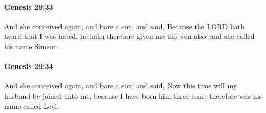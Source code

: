		\paragraph{Genesis 29:33} %
			\label{GENESIS-29-33}

			And she conceived again, and bare a son; and said, Because the LORD hath heard that I was hated, he hath therefore given me this son also: and she called his name Simeon.


		\paragraph{Genesis 29:34} %
			\label{GENESIS-29-34}

			And she conceived again, and bare a son; and said, Now this time will my husband be joined unto me, because I have born him three sons: therefore was his name called Levi.


